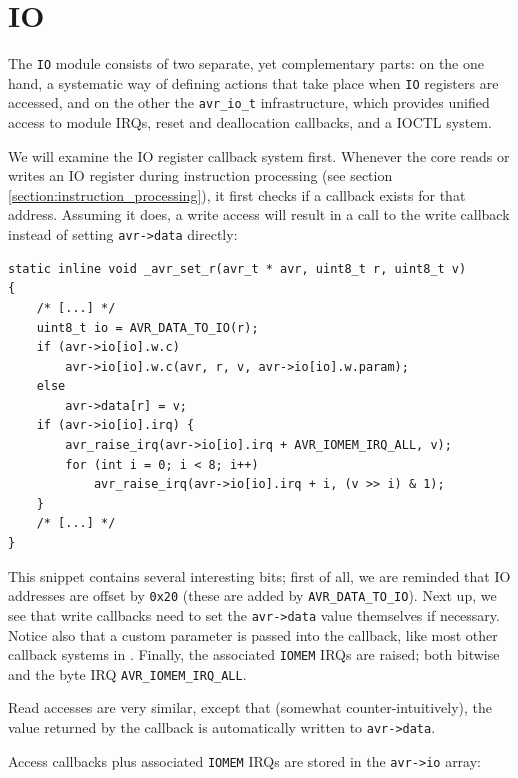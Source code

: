 \section{\acf{IO}}

The \lstinline|IO| module consists of two separate, yet complementary parts: on the one hand,
a systematic way of defining actions that take place when \lstinline|IO| registers
are accessed, and on the other the \lstinline|avr_io_t| infrastructure, which
provides unified access to module \acp{IRQ}, reset and deallocation callbacks,
and a \ac{IOCTL} system.

We will examine the \ac{IO} register callback system first. Whenever the \simavr
core reads or writes an \ac{IO} register during instruction processing (see section
\ref{section:instruction_processing}), it first checks if a callback exists for
that address. Assuming it does, a write access will result in a call to the
write callback instead of setting \lstinline|avr->data| directly:

\begin{lstlisting}
static inline void _avr_set_r(avr_t * avr, uint8_t r, uint8_t v)
{
    /* [...] */
    uint8_t io = AVR_DATA_TO_IO(r);
    if (avr->io[io].w.c)
        avr->io[io].w.c(avr, r, v, avr->io[io].w.param);
    else
        avr->data[r] = v;
    if (avr->io[io].irq) {
        avr_raise_irq(avr->io[io].irq + AVR_IOMEM_IRQ_ALL, v);
        for (int i = 0; i < 8; i++)
            avr_raise_irq(avr->io[io].irq + i, (v >> i) & 1);
    }
    /* [...] */
}
\end{lstlisting}

This snippet contains several interesting bits; first of all, we are reminded that \ac{IO}
addresses are offset by \lstinline|0x20| (these are added by \lstinline|AVR_DATA_TO_IO|).
Next up, we see that write callbacks need to set the \lstinline|avr->data| value
themselves if necessary. Notice also that a custom parameter is passed into the callback,
like most other callback systems in \simavr. Finally, the associated \lstinline|IOMEM| \acp{IRQ} are
raised; both bitwise and the byte \ac{IRQ} \lstinline|AVR_IOMEM_IRQ_ALL|.

Read accesses are very similar, except that (somewhat counter-intuitively), the value returned
by the callback is automatically written to \lstinline|avr->data|.

Access callbacks plus associated \lstinline|IOMEM| \acp{IRQ} are stored
in the \lstinline|avr->io| array:

